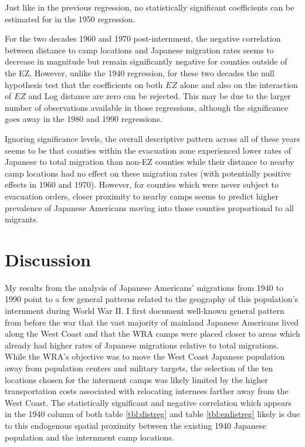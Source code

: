 \documentclass[12pt]{article}
\begin{document}
Just like in the previous regression, no statistically significant coefficients can be estimated for in the 1950 regression.

For the two decades 1960 and 1970 post-internment, the negative correlation between distance to camp locations and Japanese migration rates seems to decrease in magnitude but remain significantly negative for counties outside of the EZ.
However, unlike the 1940 regression, for these two decades the null hypothesis test that the coefficients on both $EZ$ alone and also on the interaction of $EZ$ and Log distance are zero can be rejected.
This may be due to the larger number of observations available in those regressions, although the significance goes away in the 1980 and 1990 regressions.

Ignoring significance levels, the overall descriptive pattern across all of these years seems to be that counties within the evacuation zone experienced lower rates of Japanese to total migration than non-EZ counties while their distance to nearby camp locations had no effect on these migration rates (with potentially positive effects in 1960 and 1970).
However, for counties which were never subject to evacuation orders, 
closer proximity to nearby camps seems to predict higher prevalence of Japanese Americans moving into those counties proportional to all migrants.

\section{Discussion}\label{discussion}

My results from the analysis of Japanese Americans' migrations from 1940 to 1990 
point to a few general patterns related to the geography of this population's internment during World War II.
I first document well-known general pattern from before the war 
that the vast majority of mainland Japanese Americans lived along the West Coast 
and that the WRA camps were placed closer to areas which already had higher rates of Japanese migrations relative to total migrations.
While the WRA's objective was to move the West Coast Japanese population away from population centers and military targets,
the selection of the ten locations chosen for the interment camps was likely limited by the higher transportation costs associated with relocating internees farther away from the West Coast.
The statistically significant and negative correlation which appears in the 1940 column of both table \ref{tbl:distreg} and table \ref{tbl:ezdistreg}
likely is due to this endogenous spatial proximity between the existing 1940 Japanese population and the internment camp locations.
\end{document}
